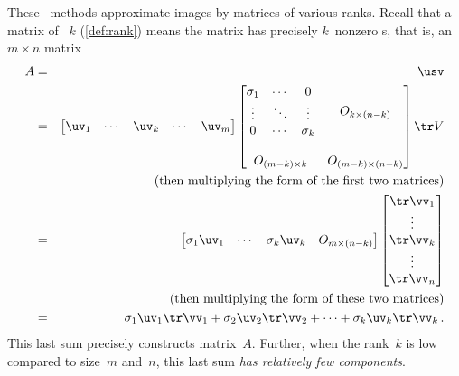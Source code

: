 These \svd\ methods approximate images by matrices of various ranks.
Recall that a matrix of ~\(k\) (\cref{def:rank}) means the matrix has precisely \(k\)~nonzero s, that is, an \(m\times n\) matrix
\begin{eqnarray*}
A&=&\usv
\\&=&
\begin{bmatrix} \uv_1&\cdots&\uv_k&\cdots&\uv_m \end{bmatrix}
\begin{bmatrix} \begin{matrix} \sigma_1&\cdots&0\\
\vdots&\ddots&\vdots\\
0&\cdots&\sigma_k \end{matrix} & 
O_{k\times (n-k)}\\\,\\
O_{(m-k)\times k}&O_{(m-k)\times (n-k)}\end{bmatrix}
\tr V
\\&&(\text{then multiplying the form of the first two matrices})
\\&=&
\begin{bmatrix} \sigma_1\uv_1&\cdots&\sigma_k\uv_k&O_{m\times(n-k)} \end{bmatrix}
\begin{bmatrix} \tr\vv_1\\\vdots\\\tr\vv_k\\\vdots\\\tr\vv_n \end{bmatrix}
\\&&(\text{then multiplying the form of these two matrices})
\\&=&
\sigma_1\uv_1\tr\vv_1+\sigma_2\uv_2\tr\vv_2+\cdots+\sigma_k\uv_k\tr\vv_k\,.
\end{eqnarray*}
This last sum precisely constructs matrix~\(A\).
Further, when the rank~\(k\) is low compared to size~\(m\) and~\(n\), this last sum \emph{has relatively few components}.




